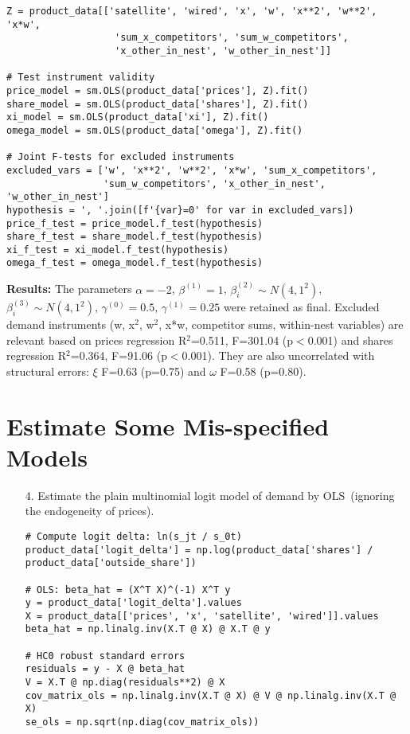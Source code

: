\documentclass[english,11pt]{article}
\begin{document}
\begin{enumerate}
\begin{verbatim}
Z = product_data[['satellite', 'wired', 'x', 'w', 'x**2', 'w**2', 'x*w', 
                   'sum_x_competitors', 'sum_w_competitors', 
                   'x_other_in_nest', 'w_other_in_nest']]

# Test instrument validity
price_model = sm.OLS(product_data['prices'], Z).fit()
share_model = sm.OLS(product_data['shares'], Z).fit()
xi_model = sm.OLS(product_data['xi'], Z).fit()
omega_model = sm.OLS(product_data['omega'], Z).fit()

# Joint F-tests for excluded instruments
excluded_vars = ['w', 'x**2', 'w**2', 'x*w', 'sum_x_competitors', 
                 'sum_w_competitors', 'x_other_in_nest', 'w_other_in_nest']
hypothesis = ', '.join([f'{var}=0' for var in excluded_vars])
price_f_test = price_model.f_test(hypothesis)
share_f_test = share_model.f_test(hypothesis)
xi_f_test = xi_model.f_test(hypothesis)
omega_f_test = omega_model.f_test(hypothesis)
\end{verbatim}

\textbf{Results:} The parameters $\alpha = -2$, $\beta^{(1)} = 1$, $\beta_i^{(2)} \sim N(4, 1^2)$, $\beta_i^{(3)} \sim N(4, 1^2)$, $\gamma^{(0)} = 0.5$, $\gamma^{(1)} = 0.25$ were retained as final. Excluded demand instruments (w, x$^2$, w$^2$, x*w, competitor sums, within-nest variables) are relevant based on prices regression R$^2$=0.511, F=301.04 (p$<$0.001) and shares regression R$^2$=0.364, F=91.06 (p$<$0.001). They are also uncorrelated with structural errors: $\xi$ F=0.63 (p=0.75) and $\omega$ F=0.58 (p=0.80).

\section{Estimate Some Mis-specified Models}

\begin{enumerate}
\item[4.] Estimate the plain multinomial logit model of demand by OLS\
(ignoring the endogeneity of prices).

\begin{verbatim}
# Compute logit delta: ln(s_jt / s_0t)
product_data['logit_delta'] = np.log(product_data['shares'] / product_data['outside_share'])

# OLS: beta_hat = (X^T X)^(-1) X^T y
y = product_data['logit_delta'].values
X = product_data[['prices', 'x', 'satellite', 'wired']].values
beta_hat = np.linalg.inv(X.T @ X) @ X.T @ y

# HC0 robust standard errors
residuals = y - X @ beta_hat
V = X.T @ np.diag(residuals**2) @ X
cov_matrix_ols = np.linalg.inv(X.T @ X) @ V @ np.linalg.inv(X.T @ X)
se_ols = np.sqrt(np.diag(cov_matrix_ols))
\end{verbatim}


\end{enumerate}
\end{enumerate}
\end{document}
